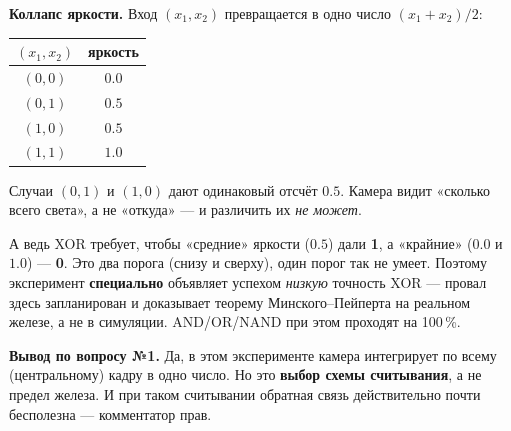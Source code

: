 \documentclass[11pt]{article}
\newenvironment{keybox}
 {\begin{lrbox}{\keybuf}\begin{minipage}{\dimexpr\linewidth-2\fboxsep-2\fboxrule}}
 {\end{minipage}\end{lrbox}%
  \par\smallskip\noindent
  \setlength{\fboxsep}{9pt}\setlength{\fboxrule}{0.9pt}%
  \fcolorbox{accent}{soft}{\usebox{\keybuf}}\par\smallskip}
\begin{document}
\begin{center}
\begin{minipage}{0.46\textwidth}
\end{minipage}\hfill
\begin{minipage}{0.5\textwidth}
\small
\textbf{Коллапс яркости.} Вход $(x_1,x_2)$ превращается в одно число $(x_1+x_2)/2$:
\smallskip

\begin{tabular}{c|c}
$(x_1,x_2)$ & яркость \\
\midrule
$(0,0)$ & $0.0$ \\
$(0,1)$ & \textcolor{accent2}{$\mathbf{0.5}$} \\
$(1,0)$ & \textcolor{accent2}{$\mathbf{0.5}$} \\
$(1,1)$ & $1.0$ \\
\end{tabular}
\smallskip

Случаи \textcolor{accent2}{$(0,1)$ и $(1,0)$ дают одинаковый отсчёт $0.5$}.
Камера видит «сколько всего света», а не «откуда» — и различить их \emph{не может}.
\end{minipage}
\end{center}

\noindent А ведь XOR требует, чтобы «средние» яркости ($0.5$) дали \textbf{1}, а
«крайние» ($0.0$ и $1.0$) — \textbf{0}. Это два порога (снизу и сверху), один
порог так не умеет. Поэтому эксперимент \textbf{специально} объявляет успехом
\emph{низкую} точность XOR — провал здесь запланирован и доказывает теорему
Минского–Пейперта на реальном железе, а не в симуляции. AND/OR/NAND при этом
проходят на 100\,\%.

\begin{keybox}
\textbf{Вывод по вопросу №1.} Да, в этом эксперименте камера интегрирует по всему
(центральному) кадру в одно число. Но это \textbf{выбор схемы считывания}, а не
предел железа. И при таком считывании обратная связь действительно почти
бесполезна — комментатор прав.
\end{keybox}
\end{document}
